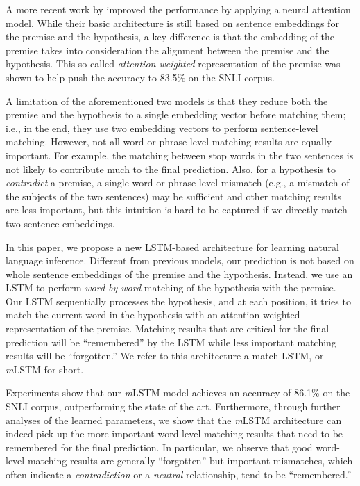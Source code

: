 \documentclass[11pt,letterpaper]{article}
\begin{document}
A more recent work by  improved the performance by applying a neural attention model.
While their basic architecture is still based on sentence embeddings for the premise and the hypothesis, a key difference is that the embedding of the premise takes into consideration the alignment between the premise and the hypothesis.
This so-called \emph{attention-weighted} representation of the premise was shown to help push the accuracy to 83.5\% on the SNLI corpus.

A limitation of the aforementioned two models is that they reduce both the premise and the hypothesis to a single embedding vector before matching them; i.e., in the end, they use two embedding vectors to perform sentence-level matching.
However, not all word or phrase-level matching results are equally important.
For example, the matching between stop words in the two sentences is not likely to contribute much to the final prediction.
Also, for a hypothesis to \emph{contradict} a premise, a single word or phrase-level mismatch (e.g., a mismatch of the subjects of the two sentences) may be sufficient and other matching results are less important, but this intuition is hard to be captured if we directly match two sentence embeddings.
 

In this paper, we propose a new LSTM-based architecture for learning natural language inference.
Different from previous models, our prediction is not based on whole sentence embeddings of the premise and the hypothesis.
Instead, we use an LSTM to perform \emph{word-by-word} matching of the hypothesis with the premise.
Our LSTM sequentially processes the hypothesis, and at each position, it tries to match the current word in the hypothesis with an attention-weighted representation of the premise.
Matching results that are critical for the final prediction will be ``remembered'' by the LSTM while less important matching results will be ``forgotten.''
We refer to this architecture a match-LSTM, or \emph{m}LSTM for short.

Experiments show that our \emph{m}LSTM model achieves an accuracy of 86.1\% on the SNLI corpus, outperforming the state of the art.
Furthermore, through further analyses of the learned parameters, we show that the \emph{m}LSTM architecture can indeed pick up the more important word-level matching results that need to be remembered for the final prediction.
In particular, we observe that good word-level matching results are generally ``forgotten'' but important mismatches, which often indicate a \emph{contradiction} or a \emph{neutral} relationship, tend to be ``remembered.''
\end{document}
